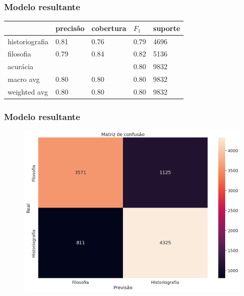 \documentclass[10pt]{beamer}
\begin{document}
\begin{frame}
	\frametitle{Modelo resultante}
	\begin{table}[!ht]
		\centering
		\begin{tabular}{lllll}
			\toprule
			{}             & precisão & cobertura & $F_1$ & suporte \\
			\midrule
			historiografia & 0.81     & 0.76      & 0.79  & 4696    \\
			filosofia      & 0.79     & 0.84      & 0.82  & 5136    \\
			\midrule
			acurácia       &          &           & 0.80  & 9832    \\
			macro avg      & 0.80     & 0.80      & 0.80  & 9832    \\
			weighted avg   & 0.80     & 0.80      & 0.80  & 9832    \\
			\bottomrule
		\end{tabular}
	\end{table}
\end{frame}

\begin{frame}
	\frametitle{Modelo resultante}
	\begin{figure}[!ht]
		\begin{center}
			\includegraphics[width=1\linewidth]{./figs/confusao.png}
		\end{center}
	\end{figure}
\end{frame}
\end{document}
